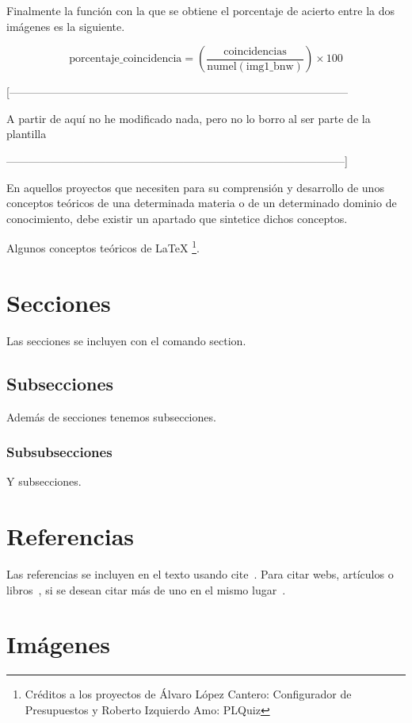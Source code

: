 Finalmente la función con la que se obtiene el porcentaje de acierto entre la dos imágenes es la siguiente.

$$\text{porcentaje\_coincidencia} = \left( \frac{\text{coincidencias}}{\text{numel}(\text{img1\_bnw})} \right) \times 100$$


[--------------------------------------------------------------------------------------------


A partir de aquí no he modificado nada, pero no lo borro al ser parte de la plantilla


--------------------------------------------------------------------------------------------]

En aquellos proyectos que necesiten para su comprensión y desarrollo de unos conceptos teóricos de una determinada materia o de un determinado dominio de conocimiento, debe existir un apartado que sintetice dichos conceptos.

Algunos conceptos teóricos de \LaTeX{} \footnote{Créditos a los proyectos de Álvaro López Cantero: Configurador de Presupuestos y Roberto Izquierdo Amo: PLQuiz}.

\section{Secciones}

Las secciones se incluyen con el comando section.

\subsection{Subsecciones}

Además de secciones tenemos subsecciones.

\subsubsection{Subsubsecciones}

Y subsecciones. 


\section{Referencias}

Las referencias se incluyen en el texto usando cite~\cite{wiki:latex}. Para citar webs, artículos o libros~\cite{koza92}, si se desean citar más de uno en el mismo lugar~\cite{bortolot2005, koza92}.


\section{Imágenes}

